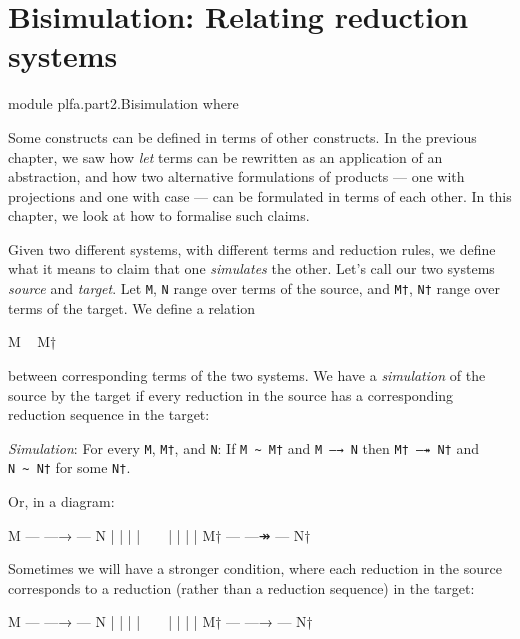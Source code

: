 \hypertarget{Bisimulation}{%
\chapter{Bisimulation: Relating reduction systems}\label{Bisimulation}}

\begin{fence}
\begin{code}
module plfa.part2.Bisimulation where
\end{code}
\end{fence}

Some constructs can be defined in terms of other constructs. In the
previous chapter, we saw how \emph{let} terms can be rewritten as an
application of an abstraction, and how two alternative formulations of
products --- one with projections and one with case --- can be
formulated in terms of each other. In this chapter, we look at how to
formalise such claims.

Given two different systems, with different terms and reduction rules,
we define what it means to claim that one \emph{simulates} the other.
Let's call our two systems \emph{source} and \emph{target}. Let
\texttt{M}, \texttt{N} range over terms of the source, and \texttt{M†},
\texttt{N†} range over terms of the target. We define a relation

\begin{myDisplay}
M ~ M†
\end{myDisplay}

between corresponding terms of the two systems. We have a
\emph{simulation} of the source by the target if every reduction in the
source has a corresponding reduction sequence in the target:

\emph{Simulation}: For every \texttt{M}, \texttt{M†}, and \texttt{N}: If
\texttt{M\ \textasciitilde{}\ M†} and \texttt{M\ —→\ N} then
\texttt{M†\ —↠\ N†} and \texttt{N\ \textasciitilde{}\ N†} for some
\texttt{N†}.

Or, in a diagram:

\begin{myDisplay}
M  --- —→ --- N
|             |
|             |
~             ~
|             |
|             |
M† --- —↠ --- N†
\end{myDisplay}

Sometimes we will have a stronger condition, where each reduction in the
source corresponds to a reduction (rather than a reduction sequence) in
the target:

\begin{myDisplay}
M  --- —→ --- N
|             |
|             |
~             ~
|             |
|             |
M† --- —→ --- N†
\end{myDisplay}

